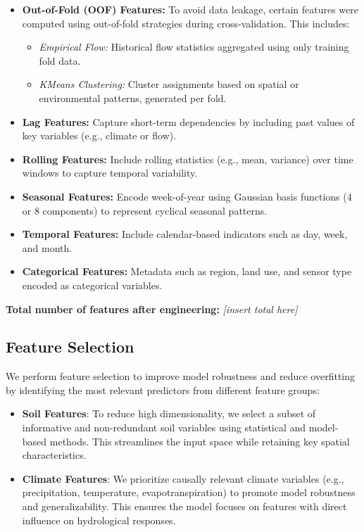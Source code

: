 \documentclass[a4paper,12pt]{article}
\begin{document}
\begin{itemize}
    \item \textbf{Out-of-Fold (OOF) Features:} To avoid data leakage, certain features were computed using out-of-fold strategies during cross-validation. This includes:
    \begin{itemize}
        \item \textit{Empirical Flow:} Historical flow statistics aggregated using only training fold data.
        \item \textit{KMeans Clustering:} Cluster assignments based on spatial or environmental patterns, generated per fold.
    \end{itemize}
    
    \item \textbf{Lag Features:} Capture short-term dependencies by including past values of key variables (e.g., climate or flow).
    
    \item \textbf{Rolling Features:} Include rolling statistics (e.g., mean, variance) over time windows to capture temporal variability.
    
    \item \textbf{Seasonal Features:} Encode week-of-year using Gaussian basis functions (4 or 8 components) to represent cyclical seasonal patterns.
    
    \item \textbf{Temporal Features:} Include calendar-based indicators such as day, week, and month.
    
    \item \textbf{Categorical Features:} Metadata such as region, land use, and sensor type encoded as categorical variables.
\end{itemize}

\noindent\textbf{Total number of features after engineering:} \textit{[insert total here]}


\subsection{Feature Selection}
We perform feature selection to improve model robustness and reduce overfitting by identifying the most relevant predictors from different feature groups:
\begin{itemize}
    \item \textbf{Soil Features}: To reduce high dimensionality, we select a subset of informative and non-redundant soil variables using statistical and model-based methods. This streamlines the input space while retaining key spatial characteristics.
    \item\textbf{Climate Features}: We prioritize causally relevant climate variables (e.g., precipitation, temperature, evapotranspiration) to promote model robustness and generalizability. This ensures the model focuses on features with direct influence on hydrological responses.
\end{itemize}
\end{document}
